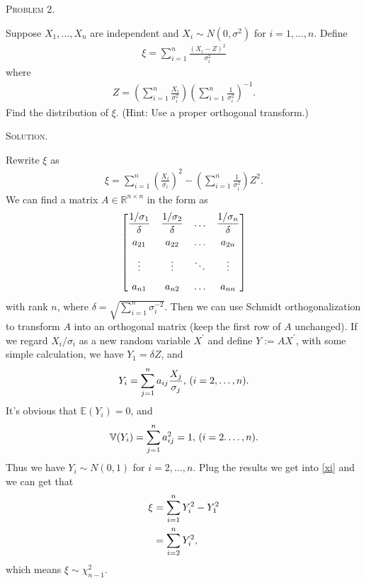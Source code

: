 \documentclass{article}
\begin{document}
\begin{CJK}{UTF8}{gbsn}
    \begin{shaded}
        \noindent\textsc{Problem 2.}\par
        Suppose $X_1,\ldots, X_n$ are independent and $X_i\sim N(0,\sigma^2)$ for $i=1,\ldots,n$. Define
        \begin{align}
            \xi = \sum_{i=1}^n \frac{(X_i-Z)^2}{\sigma_i^2}
        \end{align}
        where
        \begin{align}
            Z = \left (\sum_{i=1}^n\frac{X_i}{\sigma_i^2} \right ) \left (\sum_{i=1}^n\frac{1}{\sigma_i^2} \right )^{-1}.
        \end{align}
        Find the distribution of $\xi$. (Hint: Use a proper orthogonal transform.)
    \end{shaded}
    \noindent\textsc{Solution.}\par
    Rewrite $\xi$ as
    \begin{align}
        \xi = \sum_{i=1}^n \left ( \frac{X_i}{\sigma_i}\right )^2 - \left (\sum_{i=1}^n \frac{1}{\sigma_i^2}\right ) Z^2. \label{xi}
    \end{align}
    We can find a matrix $A\in \mathbb{R}^{n\times n}$ in the form as
    \[
        \setlength{\arraycolsep}{5.5pt}
        \begin{bmatrix}
            \dfrac{1/\sigma_1}{\delta} & \dfrac{1/\sigma_2}{\delta} & \ldots & \dfrac{1/\sigma_n}{\delta} \\[7pt]
            a_{21}                     & a_{22}                     & \ldots & a_{2n}                     \\[7pt]
            \vdots                     & \vdots                     & \ddots & \vdots                     \\[7pt]
            a_{n1}                     & a_{n2}                     & \ldots & a_{nn}
        \end{bmatrix}
    \]
    with rank $n$, where $\delta = \sqrt{\sum_{i=1}^n \sigma_i^{-2}}$.
    Then we can use Schmidt orthogonalization to transform $A$ into an orthogonal matrix (keep the first row of $A$ unchanged).
    If we regard $X_i/\sigma_i$ as a new random variable $X^{\prime}$ and define $Y:=AX^{\prime}$,
    with some simple calculation, we have $Y_1=\delta Z$,
    and
    \begin{align}
        Y_i = \sum_{j=1}^n a_{ij} \frac{X_j}{\sigma_j},\, (i=2,\ldots,n).\notag
    \end{align}
    It's obvious that $\mathbb{E}(Y_i)=0$, and
    \begin{align}
        \mathbb{V}(Y_i) = \sum_{j=1}^n a_{ij}^2 = 1, \, (i=2.\ldots,n).\notag
    \end{align}
    Thus we have $Y_i \sim N(0,1)$ for $i=2,\ldots,n$.
    Plug the results we get into \eqref{xi} and we can get that
    \begin{align}
        \xi & = \sum_{i=1}^nY_i^2 - Y_1^2 \notag \\
            & = \sum_{i=2}^n Y_i^2, \notag
    \end{align}
    which means $\xi \sim \chi^2_{n-1}$.



\end{CJK}
\end{document}
